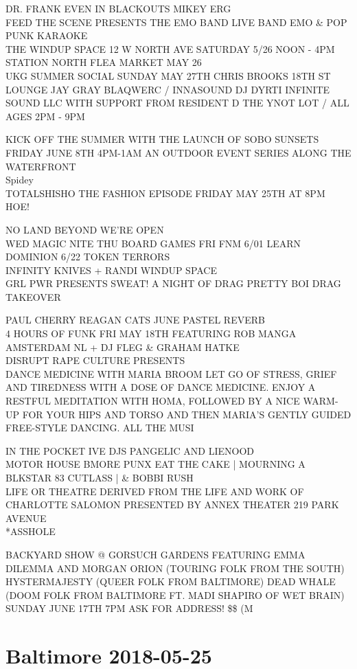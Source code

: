 \documentclass[10pt,letterpaper]{article}
\begin{document}
DR. FRANK EVEN IN BLACKOUTS MIKEY ERG\\
FEED THE SCENE PRESENTS THE EMO BAND LIVE BAND EMO \& POP PUNK KARAOKE\\
THE WINDUP SPACE 12 W NORTH AVE SATURDAY 5/26 NOON {-} 4PM STATION NORTH FLEA MARKET MAY 26\\
UKG SUMMER SOCIAL SUNDAY MAY 27TH CHRIS BROOKS 18TH ST LOUNGE JAY GRAY BLAQWERC / INNASOUND DJ DYRTI INFINITE SOUND LLC WITH SUPPORT FROM RESIDENT D THE YNOT LOT / ALL AGES 2PM {-} 9PM

KICK OFF THE SUMMER WITH THE LAUNCH OF SOBO SUNSETS FRIDAY JUNE 8TH 4PM{-}1AM AN OUTDOOR EVENT SERIES ALONG THE WATERFRONT\\
Spidey\\
TOTALSHISHO THE FASHION EPISODE FRIDAY MAY 25TH AT 8PM\\
HOE!

NO LAND BEYOND WE'RE OPEN\\
WED MAGIC NITE THU BOARD GAMES FRI FNM 6/01 LEARN DOMINION 6/22 TOKEN TERRORS\\
INFINITY KNIVES + RANDI WINDUP SPACE\\
GRL PWR PRESENTS SWEAT!  A NIGHT OF DRAG PRETTY BOI DRAG TAKEOVER

PAUL CHERRY REAGAN CATS JUNE PASTEL REVERB\\
4 HOURS OF FUNK FRI MAY 18TH FEATURING ROB MANGA AMSTERDAM NL + DJ FLEG \& GRAHAM HATKE\\
DISRUPT RAPE CULTURE PRESENTS\\
DANCE MEDICINE WITH MARIA BROOM LET GO OF STRESS, GRIEF AND TIREDNESS WITH A DOSE OF DANCE MEDICINE.  ENJOY A RESTFUL MEDITATION WITH HOMA, FOLLOWED BY A NICE WARM{-}UP FOR YOUR HIPS AND TORSO AND THEN MARIA'S GENTLY GUIDED FREE{-}STYLE DANCING.  ALL THE MUSI

IN THE POCKET IVE DJS PANGELIC AND LIENOOD\\
MOTOR HOUSE BMORE PUNX EAT THE CAKE | MOURNING A BLKSTAR 83 CUTLASS |  \& BOBBI RUSH\\
LIFE OR THEATRE DERIVED FROM THE LIFE AND WORK OF CHARLOTTE SALOMON PRESENTED BY ANNEX THEATER 219 PARK AVENUE\\
*ASSHOLE

BACKYARD SHOW @ GORSUCH GARDENS FEATURING EMMA DILEMMA AND MORGAN ORION (TOURING FOLK FROM THE SOUTH) HYSTERMAJESTY (QUEER FOLK FROM BALTIMORE) DEAD WHALE (DOOM FOLK FROM BALTIMORE FT. MADI SHAPIRO OF WET BRAIN) SUNDAY JUNE 17TH 7PM ASK FOR ADDRESS! \$\$ (M


\section*{Baltimore 2018-05-25}
\end{document}
